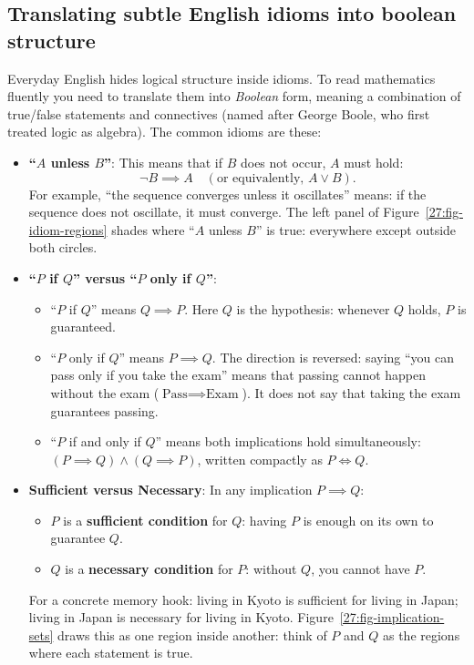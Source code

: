 \subsection{Translating subtle English idioms into boolean structure}

Everyday English hides logical structure inside idioms. To read mathematics fluently you need to translate them into \emph{Boolean} form, meaning a combination of true/false statements and connectives (named after George Boole, who first treated logic as algebra). The common idioms are these:

\begin{itemize}
\item \textbf{``$A$ unless $B$''}: This means that if $B$ does not occur, $A$ must hold:
\[
\neg B \implies A \quad (\text{or equivalently, } A \lor B).
\]
For example, ``the sequence converges unless it oscillates'' means: if the sequence does not oscillate, it must converge. The left panel of Figure~\ref{27:fig-idiom-regions} shades where ``$A$ unless $B$'' is true: everywhere except outside both circles.

\item \textbf{``$P$ if $Q$'' versus ``$P$ only if $Q$''}:
\begin{itemize}
\item ``$P$ if $Q$'' means $Q \implies P$. Here $Q$ is the hypothesis: whenever $Q$ holds, $P$ is guaranteed.
\item ``$P$ only if $Q$'' means $P \implies Q$. The direction is reversed: saying ``you can pass only if you take the exam'' means that passing cannot happen without the exam ($\text{Pass} \implies \text{Exam}$). It does not say that taking the exam guarantees passing.
\item ``$P$ if and only if $Q$'' means both implications hold simultaneously: $(P \implies Q) \land (Q \implies P)$, written compactly as $P \iff Q$.
\end{itemize}

\item \textbf{Sufficient versus Necessary}: In any implication $P \implies Q$:
\begin{itemize}
\item $P$ is a \textbf{sufficient condition} for $Q$: having $P$ is enough on its own to guarantee $Q$.
\item $Q$ is a \textbf{necessary condition} for $P$: without $Q$, you cannot have $P$.
\end{itemize}
For a concrete memory hook: living in Kyoto is sufficient for living in Japan; living in Japan is necessary for living in Kyoto. Figure~\ref{27:fig-implication-sets} draws this as one region inside another: think of $P$ and $Q$ as the regions where each statement is true.


\end{itemize}
